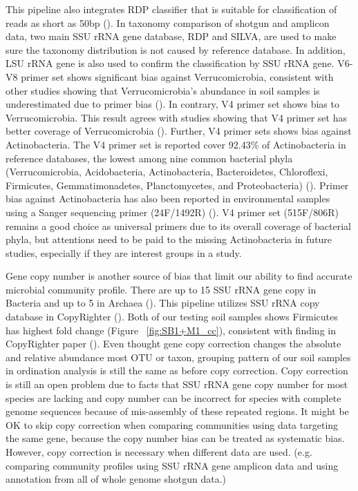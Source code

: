 \documentclass[12pt]{article}
\begin{document}
  This pipeline also integrates RDP classifier that is suitable for classification of reads as short as 50bp (\cite{rdpclassifier}). In taxonomy comparison of shotgun and amplicon data, two main SSU rRNA gene database, RDP and SILVA, are used to make sure the taxonomy distribution is not caused by reference database. In addition, LSU rRNA gene is also used to confirm the classification by SSU rRNA gene. V6-V8 primer set shows significant bias against Verrucomicrobia, consistent with other studies showing that Verrucomicrobia’s abundance in soil samples is underestimated due to primer bias (\cite{verruco2011}). In contrary, V4 primer set shows bias to Verrucomicrobia. This result agrees with studies showing that V4 primer set has better coverage of Verrucomicrobia (\cite{verruco2011}). Further, V4 primer sets shows bias against Actinobacteria. The V4 primer set is reported cover 92.43\% of Actinobacteria in reference databases, the lowest among nine common bacterial phyla (Verrucomicrobia, Acidobacteria, Actinobacteria, Bacteroidetes, Chloroflexi, Firmicutes, Gemmatimonadetes, Planctomycetes, and Proteobacteria) (\cite{verruco2011}). Primer bias against Actinobacteria has also been reported in environmental samples using a Sanger sequencing primer (24F/1492R) (\cite{actinobias}). V4 primer set (515F/806R) remains a good choice as universal primers due to its overall coverage of bacterial phyla, but attentions need to be paid to the missing Actinobacteria in future studies, especially if they are interest groups in a study.

  Gene copy number is another source of bias that limit our ability to find accurate microbial community profile. There are up to 15 SSU rRNA gene copy in Bacteria and up to 5 in Archaea (\cite{rrncopy2004}). This pipeline utilizes SSU rRNA copy database in CopyRighter (\cite{copyrighter}). Both of our testing soil samples shows Firmicutes has highest fold change (Figure ~\ref{fig:SB1+M1_cc}), consistent with finding in CopyRighter paper (\cite{copyrighter}). Even thought gene copy correction changes the absolute and relative abundance most OTU or taxon, grouping pattern of our soil samples in ordination analysis is still the same as before copy correction. Copy correction is still an open problem due to facts that SSU rRNA gene copy number for most species are lacking and copy number can be incorrect for species with complete genome sequences because of mis-assembly of these repeated regions. It might be OK to skip copy correction when comparing communities using data targeting the same gene, because the copy number bias can be treated as systematic bias. However, copy correction is necessary when different data are used. (e.g. comparing community profiles using SSU rRNA gene amplicon data and using annotation from all of whole genome shotgun data.)
\end{document}
